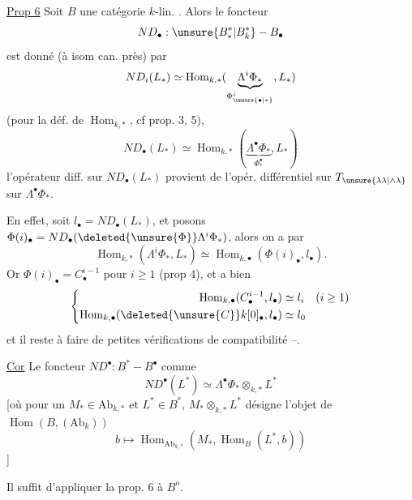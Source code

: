 \uline{Prop 6} Soit $B$ une catégorie $k$-lin. .
Alors le foncteur
\[
ND_\bullet:\unsure{B^*_*|B^*_k}\mathbin{-}B_\bullet
\]
est donné (à isom can. près) par
\[
ND_i(L_*)\simeq\operatorname{Hom}_{k,*}
(\underbrace{\Lambda^i\Phi_*}_{\Phi^i_{\unsure{\bullet|*}}},L_*)
\]
(pour la déf. de $\operatorname{Hom}_{k,*}$, cf prop. 3, 5),
\[
ND_\bullet(L_*)\simeq\operatorname{Hom}_{k,*}
(\underbrace{\Lambda^\bullet\Phi_*}_{\Phi_*^\bullet},L_*)
\]
l'opérateur diff. sur $ND_\bullet(L_*)$ provient de l'opér. différentiel sur
$T_{\unsure{\lambda\lambda|\wedge\lambda}}$ sur $\Lambda^\bullet\Phi_*$.

En effet,  soit $l_\bullet=ND_\bullet(L_*)$,
et posons $\Phi(i)_\bullet=ND_\bullet(\deleted{\unsure{\Phi}}\Lambda^i\Phi_*)$,
alors on a par 
\[
\operatorname{Hom}_{k,*}(\Lambda^i\Phi_*,L_*)
\simeq\operatorname{Hom}_{k,\bullet}(\Phi(i)_\bullet,l_\bullet).
\]
Or $\Phi(i)_\bullet=C_\bullet^{i-1}$ pour $i\geq1$ (prop 4), et
a bien
\[
\left\{\begin{aligned}
\operatorname{Hom}_{k,\bullet}(C_\bullet^{i-1},l_\bullet)&\simeq l_i\quad(i\geq1)\\
\operatorname{Hom}_{k,\bullet}(\deleted{\unsure{C}}k[0]_\bullet,l_\bullet)&\simeq l_0
\end{aligned}\right.
\]
et il reste à faire de petites vérifications de compatibilité --.

\uline{Cor} Le foncteur $ND^\bullet:B^*\mathbin{-}B^\bullet$  comme
\[
ND^\bullet(L^*)\simeq\Lambda^\bullet\Phi_*\otimes_{k,*}L^*
\]
[où pour un $M_*\in\mathrm{Ab}_{k,*}$ et $L^*\in B^*$,
$M_*\otimes_{k,*}L^*$ désigne l'objet de $\operatorname{Hom}(B,(\mathrm{Ab}_k))$
\[
b\longmapsto\operatorname{Hom}_{\mathrm{Ab}_{k,*}}
(M_*,\operatorname{Hom}_{B}(L^*,b))
\]
]

Il suffit d'appliquer la prop. 6 à $B^o$.

